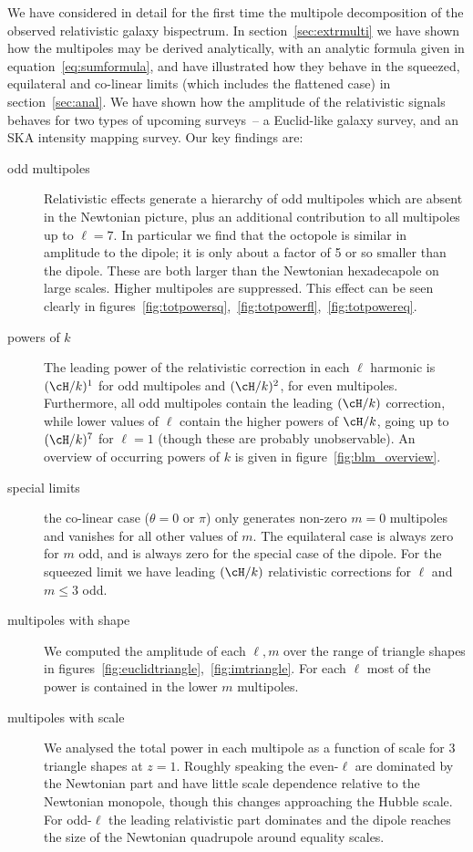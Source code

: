 {We have considered in detail for the first time the multipole decomposition of the observed relativistic galaxy bispectrum. In section~\ref{sec:extrmulti} we have shown how the multipoles may be derived analytically, with an analytic formula given in equation~\eqref{eq:sumformula}, and have illustrated how they behave in the squeezed, equilateral and co-linear limits (which includes the flattened case) in section~\ref{sec:anal}. We have shown how the amplitude of the relativistic signals behaves for two types of upcoming surveys~-- a Euclid-like galaxy survey, and an SKA intensity mapping survey. Our key findings are:
\begin{description}
\item[odd multipoles] Relativistic effects generate a hierarchy of odd multipoles which are absent in the Newtonian picture, plus an additional contribution to all multipoles up to $\ell=7$. In particular we find that the octopole is similar in amplitude to the dipole; it is only about a factor of 5 or so smaller than the dipole. These are both larger than the Newtonian hexadecapole on large scales. Higher multipoles are suppressed. This effect can be seen clearly in figures~\ref{fig:totpowersq},~\ref{fig:totpowerfl},~\ref{fig:totpowereq}.
%
\item[powers of $k$] The leading power of the relativistic correction in each $\ell$ harmonic is $(\cH/k)^1$ for odd multipoles and $(\cH/k)^2$, for even multipoles. Furthermore, all odd multipoles contain the leading $(\cH/k)$ correction, while lower values of \(\ell\) contain the higher powers of \(\cH/k\), going up to \((\cH/k)^7\) for \(\ell=1\) (though these are probably unobservable). An overview of occurring powers of \(k\) is given in figure~\ref{fig:blm_overview}.
%
\item[special limits] the co-linear case ($\theta=0$ or $\pi$) only generates non-zero $m=0$ multipoles and vanishes for all other values of \(m\). The equilateral case is always zero for $m$ odd, and is always zero for the special case of the dipole. For the squeezed limit we have leading $(\cH/k)$ relativistic corrections for $\ell$ and $m\leq3$ odd.
%
\item[multipoles with shape] We computed the amplitude of each $\ell,m$ over the range of triangle shapes in figures~\ref{fig:euclidtriangle},~\ref{fig:imtriangle}. For each $\ell$ most of the power is contained in the lower $m$ multipoles. 
%
\item[multipoles with scale] We analysed the total power in each multipole as a function of scale for 3 triangle shapes at $z=1$. Roughly speaking the even-$\ell$ are dominated by the Newtonian part and have little scale dependence relative to the Newtonian monopole, though this changes approaching the Hubble scale. For odd-$\ell$ the leading relativistic part dominates and the dipole reaches the size of the Newtonian quadrupole around equality scales.

\end{description}}
